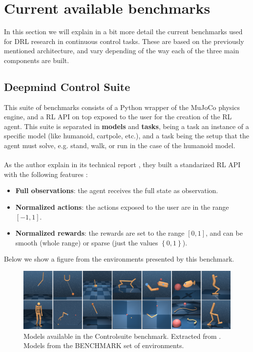 \section{Current available benchmarks}

    In this section we will explain in a bit more detail the current benchmarks used for DRL research in
    continuous control tasks. These are based on the previously mentioned architecture, and vary depending 
    of the way each of the three main components are built.

    \subsection{Deepmind Control Suite}
    This suite of benchmarks consists of a Python wrapper of the MuJoCo physics engine, and a RL API on top
    exposed to the user for the creation of the RL agent. This suite is separated in \textbf{models} and \textbf{tasks},
    being a task an instance of a specific model (like humanoid, cartpole, etc.), and a task being the setup that
    the agent must solve, e.g. stand, walk, or run in the case of the humanoid model.
    \\
    \\
    As the author explain in its technical report \citep{Controlsuite}, they built a standarized RL API with 
    the following features :

    \begin{itemize}
        \item \textbf{Full observations}: the agent receives the full state as observation.
        \item \textbf{Normalized actions}: the actions exposed to the user are in the range $\left[-1,1\right]$.
        \item \textbf{Normalized rewards}: the rewards are set to the range $\left[ 0, 1 \right]$, and can be smooth (whole range)
                or sparse (just the values $\left\{0,1\right\}$).
    \end{itemize}

    Below we show a figure from the environments presented by this benchmark.

    \begin{figure}[!ht]
        \centering
        \includegraphics[width=5.5in]{./chapters/imgs/img_controlsuite_envs.png}
        \caption[Controlsuite models]{Models available in the Controlsuite benchmark. Extracted from \citet{Controlsuite}.
                                      Models from the BENCHMARK set of environments.}
        \label{fig:controlsuite-envs}
    \end{figure}


